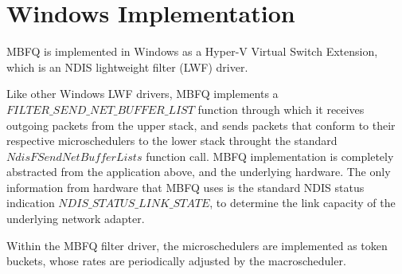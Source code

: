 \section{Windows Implementation}
\label{sec:implementation}

MBFQ is implemented in Windows as a Hyper-V Virtual Switch Extension, which is an NDIS 
lightweight filter (LWF) driver.

Like other Windows LWF drivers, MBFQ implements a $FILTER\_SEND\_NET\_BUFFER\_LIST$ function
through which it receives outgoing packets from the upper stack, and sends packets that conform
to their respective microschedulers to the lower stack throught the standard $NdisFSendNetBufferLists$
function call.  MBFQ implementation is completely abstracted from the application above, and the underlying 
hardware.  The only information from hardware that MBFQ uses is the standard NDIS status indication
$NDIS\_STATUS\_LINK\_STATE$, to determine the link capacity of the underlying network adapter.

Within the MBFQ filter driver, the microschedulers are implemented as token buckets, whose rates are
periodically adjusted by the macroscheduler.


